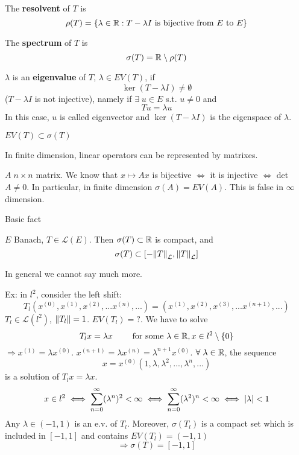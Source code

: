\begin{definition}
    The \textbf{resolvent} of \(T\) is 
    \[
        \rho(T) = \{ \lambda \in \mathbb{R}: T - \lambda I \text{ is bijective from } E \text{ to } E\}
    \]
\end{definition}
\begin{definition}
    The \textbf{spectrum} of \(T\) is    
    \[
        \sigma(T) = \mathbb{R} \setminus \rho(T)
    \]
\end{definition}
\begin{definition}
    \(\lambda\) is an \textbf{eigenvalue} of \(T\), \(\lambda \in EV(T) \), if 
    \[
        \ker(T- \lambda I) \neq \emptyset
    \]
    (\(T - \lambda I\) is not injective), namely if \(\exists \; u \in E\) s.t. \(u \neq 0\) and
    \[
        T u = \lambda u
    \]
    In this case, \(u\) is called eigenvector and \(\ker(T-\lambda I)\) is the eigenspace of \(\lambda\).
\end{definition}
\begin{remark}
    \(EV(T) \subset \sigma(T)\)
\end{remark}
\begin{remark}
    In finite dimension, linear operators can be represented by matrixes.

    \(A \; n \times n\) matrix. We know that \(x \mapsto Ax\) is bijective \(\iff \) it is injective \(\iff \) det\(A \neq 0\). In particular, in finite dimension \(\sigma(A) = EV(A)\). This is false in \(\infty \) dimension.
\end{remark}

Basic fact
\begin{theorem}
    \(E\) Banach, \(T \in \mathcal{L}(E)\). Then \(\sigma(T) \subset \mathbb{R}\) is compact, and 
    \[
        \sigma(T) \subset \left[ - \norm{T}_\mathcal{L}, \norm{T}_\mathcal{L} \right]
    \]
\end{theorem}

In general we cannot say much more.

Ex: in \(l^2\), consider the left shift:
\[
    T_l(x^{(0)}, x^{(1)}, x^{(2)},... x^{(n)},...) = (x^{(1)}, x^{(2)}, x^{(3)},... x^{(n+1)},...)
\]
\(T_l \in \mathcal{L}(l^2)\), \(\norm{T_l}=1\). \(EV(T_l)=?\). We have to solve
\[
    T_l x = \lambda x \qquad \text{ for some } \lambda \in \mathbb{R}, x \in l^2 \setminus \{0\}
\]
\(\Rightarrow x^{(1)}=\lambda x^{(0)}\). \(x^{(n+1)} = \lambda x^{(n)} = \lambda^{n+1} x^{(0)}\). \(\forall \; \lambda \in \mathbb{R}\), the sequence
\[
    x = x^{(0)} \left(1, \lambda,\lambda^2, ..., \lambda^n, ...\right)
\]
is a solution of \(T_l x = \lambda x\).
\[
    x \in l^2 \iff \sum_{n=0}^\infty (\lambda^n)^2 < \infty \iff \sum_{n=0}^\infty (\lambda^2)^n < \infty \iff \abs{\lambda} < 1
\]
Any \(\lambda \in (-1, 1)\) is an e.v. of \(T_l\). Moreover, \(\sigma(T_l)\) is a compact set which is included in \([-1, 1]\) and contains \(EV(T_l) =(-1, 1)\)
\[
    \Rightarrow \sigma(T) = [-1, 1]
\]
